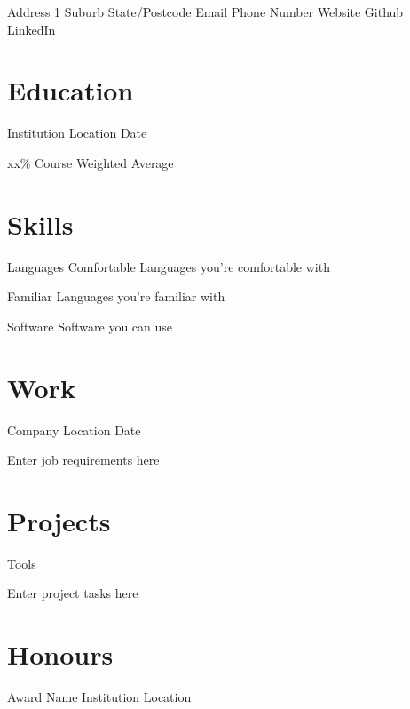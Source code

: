 \documentclass{elliot-cv}
\begin{document}

\contact
{Address 1}
{Suburb}
{State/Postcode}
{Email}
{Phone Number}
{Website}
{Github}
{LinkedIn}

\section{Education}
 {Institution} {Location} {Date}
\begin{entryitems}
    \item{xx\% Course Weighted Average}
\end{entryitems}

\section{Skills}
\begin{skillset}
    \skillboth
    {Languages}
    {Comfortable}
    {Languages you're comfortable with}

    \skillminor
    {Familiar}
    {Languages you're familiar with}

    \skillmajor
    {Software}
    {Software you can use}
\end{skillset}

\section{Work}
 {Company} {Location} {Date}
\begin{entryitems}
    \item{Enter job requirements here}
\end{entryitems}

\section{Projects}
 {Tools}
\begin{entryitems}
    \item{Enter project tasks here}
\end{entryitems}

\section{Honours}
 {Award Name} {Institution} {Location}
\end{document}
